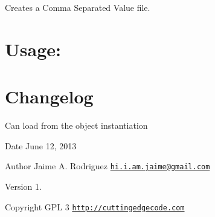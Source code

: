 Creates a Comma Separated Value file.\hypertarget{nav1_usage}{}\section{Usage\-:}\label{nav1_usage}

\hypertarget{mailer1_changelog}{}\section{Changelog}\label{mailer1_changelog}

\begin{DoxyItemize}
\item Can load from the object instantiation
\end{DoxyItemize}

\begin{DoxyDate}{Date}
June 12, 2013 
\end{DoxyDate}
\begin{DoxyAuthor}{Author}
Jaime A. Rodriguez \href{mailto:hi.i.am.jaime@gmail.com}{\tt hi.\-i.\-am.\-jaime@gmail.\-com} 
\end{DoxyAuthor}
\begin{DoxyVersion}{Version}
1. 
\end{DoxyVersion}
\begin{DoxyCopyright}{Copyright}
G\-P\-L 3 \href{http://cuttingedgecode.com}{\tt http\-://cuttingedgecode.\-com} 
\end{DoxyCopyright}
